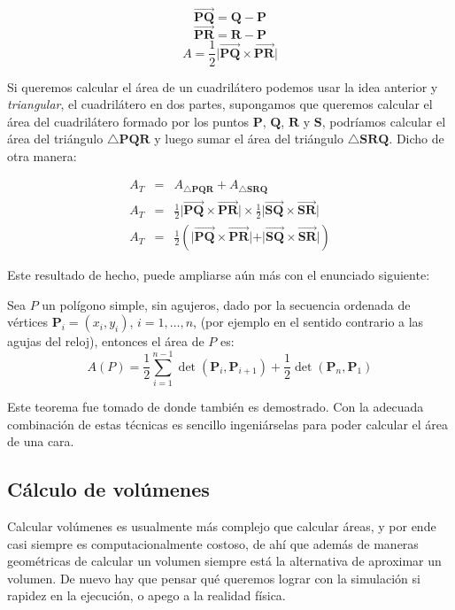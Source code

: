 $$\overrightarrow{\textbf{PQ}} = \textbf{Q} - \textbf{P}$$
$$\overrightarrow{\textbf{PR}} = \textbf{R} - \textbf{P}$$
$$ A = \frac{1}{2} \vert \overrightarrow{\textbf{PQ}} \times \overrightarrow{\textbf{PR}} \vert$$

Si queremos calcular el área de un cuadrilátero podemos usar la idea anterior y \emph{triangular}, el cuadrilátero en dos partes, supongamos que queremos calcular el área del cuadrilátero formado por los puntos $\textbf{P}$, $\textbf{Q}$, $\textbf{R}$ y $\textbf{S}$, podríamos calcular el área del triángulo $\triangle \textbf{PQR}$ y luego sumar el área del triángulo $\triangle \textbf{SRQ}$.
Dicho de otra manera:

\begin{eqnarray} 
A_{T} & = & A_{\triangle \textbf{PQR}} + A_{\triangle \textbf{SRQ}} \nonumber \\
A_{T} & = & \frac{1}{2} \vert \overrightarrow{\textbf{PQ}} \times \overrightarrow{\textbf{PR}} \vert \times \frac{1}{2} \vert \overrightarrow{\textbf{SQ}} \times \overrightarrow{\textbf{SR}} \vert \nonumber \\
\label{formulaArea}
A_{T} & = & \frac{1}{2} \left( \vert \overrightarrow{\textbf{PQ}} \times \overrightarrow{\textbf{PR}} \vert + \vert \overrightarrow{\textbf{SQ}} \times \overrightarrow{\textbf{SR}} \vert \right)
\end{eqnarray}

Este resultado de hecho, puede ampliarse aún más con el enunciado siguiente:

Sea $P$ un polígono simple, sin agujeros, dado por la secuencia ordenada de vértices $\textbf{P}_i = (x_i, y_i)$, $i = 1,\ldots,n$, (por ejemplo en el sentido contrario a las agujas del reloj), entonces el área de $P$ es:
$$A(P) = \frac{1}{2}\sum^{n-1}_{i = 1} \det (\textbf{P}_i, \textbf{P}_{i + 1}) + \frac{1}{2} \det (\textbf{P}_n, \textbf{P}_1)$$

Este teorema fue tomado de \cite{GeometriaParaCAD} donde también es demostrado. 
Con la adecuada combinación de estas técnicas es sencillo ingeniárselas para poder calcular el área de una cara.

\subsection{Cálculo de volúmenes}
Calcular volúmenes es usualmente más complejo que calcular áreas, y por ende casi siempre es computacionalmente costoso, de ahí que además de maneras geométricas de calcular un volumen siempre está la alternativa de aproximar un volumen.
De nuevo hay que pensar qué queremos lograr con la simulación si rapidez en la ejecución, o apego a la realidad física.

